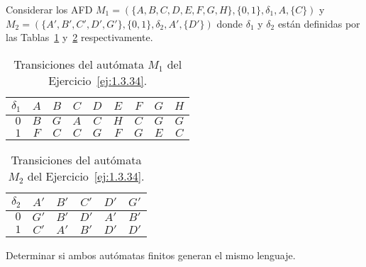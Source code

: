 \begin{ejercicio}\label{ej:1.3.34}
    Considerar los AFD $M_1=(\{A,B,C,D,E,F,G,H\}, \{0,1\}, \delta_1, A, \{C\})$ y $M_2=(\{A',B',C',D',G'\}, \{0,1\}, \delta_2, A', \{D'\})$ donde $\delta_1$ y $\delta_2$ están definidas por las Tablas~\ref{tab:1.3.34-M1} y~\ref{tab:1.3.34-M2} respectivamente.
    \begin{table}[h]
        \centering
        \begin{tabular}{r|cccccccc}
            $\delta_1$ & $A$ & $B$ & $C$ & $D$ & $E$ & $F$ & $G$ & $H$ \\
            \hline
            $0$ & $B$ & $G$ & $A$ & $C$ & $H$ & $C$ & $G$ & $G$ \\
            $1$ & $F$ & $C$ & $C$ & $G$ & $F$ & $G$ & $E$ & $C$
        \end{tabular}
        \caption{Transiciones del autómata $M_1$ del Ejercicio~\ref{ej:1.3.34}.}
        \label{tab:1.3.34-M1}
    \end{table}
    \begin{table}[h]
        \centering
        \begin{tabular}{r|ccccc}
            $\delta_2$ & $A'$ & $B'$ & $C'$ & $D'$ & $G'$ \\
            \hline
            $0$ & $G'$ & $B'$ & $D'$ & $A'$ & $B'$ \\
            $1$ & $C'$ & $A'$ & $B'$ & $D'$ & $D'$
        \end{tabular}
        \caption{Transiciones del autómata $M_2$ del Ejercicio~\ref{ej:1.3.34}.}
        \label{tab:1.3.34-M2}
    \end{table}
    Determinar si ambos autómatas finitos generan el mismo lenguaje.
\end{ejercicio}

